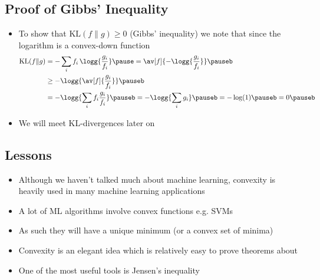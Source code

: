 \begin{slide}
  \section[-1]{Proof of Gibbs' Inequality}

  \begin{PauseHighLight}
  \begin{itemize}
  \item To show that $\mathrm{KL}(f \| g)\geq 0$ (Gibbs' inequality) we
    note that since the logarithm is a convex-down function
    \begin{align*}
      \mathrm{KL}(f \| g)
      &= - \sum_i f_i \, \logg{\frac{g_i}{f_i}} \pause
        = \av[f]{-\logg{\frac{g_i}{f_i}}}\pauseb\\
      &\geq -\logg{\av[f]{\frac{g_i}{f_i}}}\pauseb \\
      &= - \logg{\sum_i f_i \frac{g_i}{f_i}}\pauseb
      = -\logg{\sum_i g_i}\pauseb = -\log(1) \pauseb = 0\pauseb
    \end{align*}
  \item We will meet KL-divergences later on\pauseb
  \end{itemize}
\end{PauseHighLight}


\end{slide}


\begin{slide}
\section{Lessons}

\begin{PauseHighLight}
  \begin{itemize}
  \item Although we haven't talked much about machine learning,
    convexity is heavily used in many machine learning applications\pause
  \item A lot of ML algorithms involve convex functions\pause{} e.g.{}
    SVMs\pauseb
  \item As such they will have a unique minimum (or a convex set of
    minima)\pause
  \item Convexity is an elegant idea which is relatively easy to
    prove theorems about\pause
  \item One of the most useful tools is Jensen's inequality\pause
  \end{itemize}
\end{PauseHighLight}

\end{slide}


